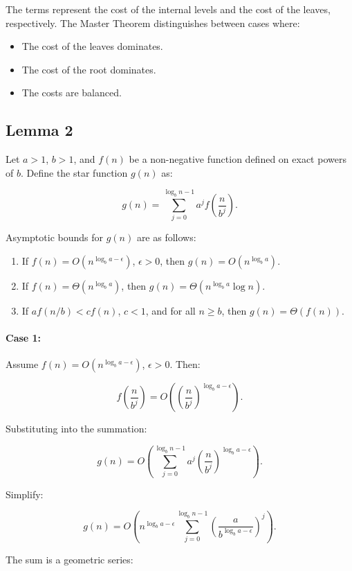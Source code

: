 The terms represent the cost of the internal levels and the cost of the leaves, respectively. The Master Theorem distinguishes between cases where:
\begin{itemize}
    \item The cost of the leaves dominates.
    \item The cost of the root dominates.
    \item The costs are balanced.
\end{itemize}

\subsection{Lemma 2}

Let \(a > 1\), \(b > 1\), and \(f(n)\) be a non-negative function defined on exact powers of \(b\). Define the star function \(g(n)\) as:

\[
g(n) = \sum_{j=0}^{\log_b n - 1} a^j f\left(\frac{n}{b^j}\right).
\]

Asymptotic bounds for \(g(n)\) are as follows:
\begin{enumerate}
    \item If \(f(n) = O(n^{\log_b a - \epsilon})\), \(\epsilon > 0\), then \(g(n) = O(n^{\log_b a})\).
    \item If \(f(n) = \Theta(n^{\log_b a})\), then \(g(n) = \Theta(n^{\log_b a} \log n)\).
    \item If \(af(n/b) < c f(n)\), \(c < 1\), and for all \(n \geq b\), then \(g(n) = \Theta(f(n))\).
\end{enumerate}

\paragraph{Case 1:}
Assume \(f(n) = O(n^{\log_b a - \epsilon})\), \(\epsilon > 0\). Then:

\[
f\left(\frac{n}{b^j}\right) = O\left(\left(\frac{n}{b^j}\right)^{\log_b a - \epsilon}\right).
\]

Substituting into the summation:

\[
g(n) = O\left(\sum_{j=0}^{\log_b n - 1} a^j \left(\frac{n}{b^j}\right)^{\log_b a - \epsilon}\right).
\]

Simplify:

\[
g(n) = O\left(n^{\log_b a - \epsilon} \sum_{j=0}^{\log_b n - 1} \left(\frac{a}{b^{\log_b a - \epsilon}}\right)^j\right).
\]

The sum is a geometric series:


